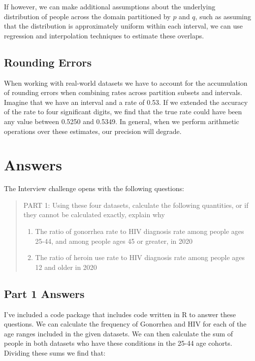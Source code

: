 \documentclass[]{article}
\begin{document}
If however, we can make additional assumptions about the underlying
distribution of people across the domain partitioned by \(p\) and \(q\),
such as assuming that the distribution is approximately uniform within
each interval, we can use regression and interpolation techniques to
estimate these overlaps.

\hypertarget{rounding-errors}{%
\subsection{Rounding Errors}\label{rounding-errors}}

When working with real-world datasets we have to account for the
accumulation of rounding errors when combining rates across partition
subsets and intervals. Imagine that we have an interval and a rate of
0.53. If we extended the accuracy of the rate to four significant
digits, we find that the true rate could have been any value between
0.5250 and 0.5349. In general, when we perform arithmetic operations
over these estimates, our precision will degrade.

\hypertarget{answers}{%
\section{Answers}\label{answers}}

The Interview challenge opens with the following questions:

\begin{quote}
PART 1: Using these four datasets, calculate the following quantities,
or if they cannot be calculated exactly, explain why

\begin{enumerate}
\def\labelenumi{\arabic{enumi}.}
\item
  The ratio of gonorrhea rate to HIV diagnosis rate among people ages
  25-44, and among people ages 45 or greater, in 2020
\item
  The ratio of heroin use rate to HIV diagnosis rate among people ages
  12 and older in 2020
\end{enumerate}
\end{quote}

\hypertarget{part-1-answers}{%
\subsection{Part 1 Answers}\label{part-1-answers}}

I've included a code package that includes code written in R to answer
these questions. We can calculate the frequency of Gonorrhea and HIV for
each of the age ranges included in the given datasets. We can then
calculate the sum of people in both datasets who have these conditions
in the 25-44 age cohorts. Dividing these sums we find that:
\end{document}
